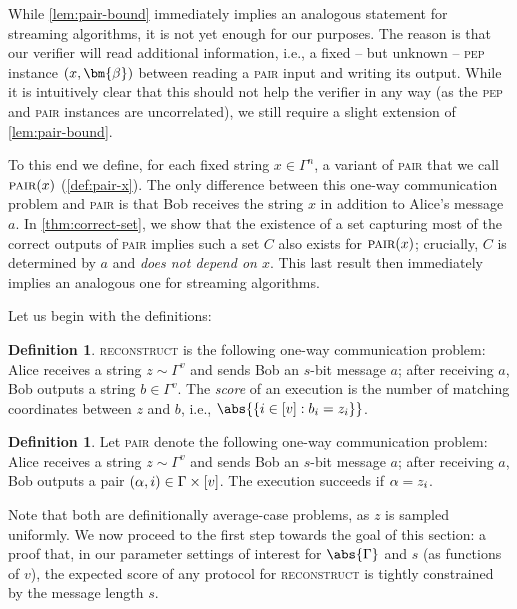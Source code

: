\documentclass[a4paper,UKenglish,cleveref, autoref, thm-restate]{lipics-v2021}
\theoremstyle{definition}
\newtheorem{definition}[theorem]{Definition}
\renewcommand{\set}[1]{\left\{#1\right\}}
\newcommand{\pair}{\normalfont\textsc{pair}\xspace}
\newcommand{\reconstruct}{\normalfont\textsc{reconstruct}\xspace}
\newcommand{\pep}{\normalfont\textsc{pep}\xspace}
\newcommand{\vcommitlength}{v}
\newcommand{\vcommitstring}{z}
\newcommand{\evaluationpoint}{\bm{\fe2}}
\newcommand{\alphabet}{\Gamma}
\def\fe#1{
    \ifnum#1=1
        \alpha
    \else
    \ifnum#1=2
        \beta
    \else
    \ifnum#1=3
        \gamma
    \fi\fi\fi
}
\begin{document}
While \cref{lem:pair-bound} immediately implies an analogous statement for streaming algorithms, it is not yet enough for our purposes. The reason is that our verifier will read additional information, i.e., a fixed -- but unknown -- \pep instance $(x, \evaluationpoint)$ between reading a \pair input and writing its output. While it is intuitively clear that this should not help the verifier in any way (as the \pep and \pair instances are uncorrelated), we still require a slight extension of \cref{lem:pair-bound}.

To this end we define, for each fixed string $x \in \alphabet^n$, a variant of \pair that we call $\pair(x)$ (\cref{def:pair-x}). The only difference between this one-way communication problem and \pair is that Bob receives the string $x$ in addition to Alice's message $a$. In \cref{thm:correct-set}, we show that the existence of a set capturing most of the correct outputs of \pair implies such a set $C$ also exists for $\pair(x)$; crucially, $C$ is determined by $a$ and \emph{does not depend on $x$}. This last result then immediately implies an analogous one for streaming algorithms.

Let us begin with the definitions:

\begin{definition}
    \label{def:reconstruct}
    \reconstruct is the following one-way communication problem: Alice receives a string $\vcommitstring \sim \alphabet^\vcommitlength$ and sends Bob an $s$-bit message $a$; after receiving $a$, Bob outputs a string $b \in \alphabet^\vcommitlength$. The \emph{score} of an execution is the number of matching coordinates between $\vcommitstring$ and $b$, i.e., $\abs{\set{i \in [\vcommitlength] : b_i = \vcommitstring_i}}$.
\end{definition}

\begin{definition}
    \label{def:pair}
    Let \pair denote the following one-way communication problem: Alice receives a string $\vcommitstring \sim \alphabet^\vcommitlength$ and sends Bob an $s$-bit message $a$; after receiving $a$, Bob outputs a pair $(\fe1, i) \in \alphabet \times [\vcommitlength]$. The execution succeeds if $\fe1 = \vcommitstring_i$.
\end{definition}

Note that both are definitionally average-case problems, as $\vcommitstring$ is sampled uniformly. We now proceed to the first step towards the goal of this section: a proof that, in our parameter settings of interest for $\abs{\alphabet}$ and $s$ (as functions of $\vcommitlength$), the expected score of any protocol for \reconstruct is tightly constrained by the message length $s$.
\end{document}
